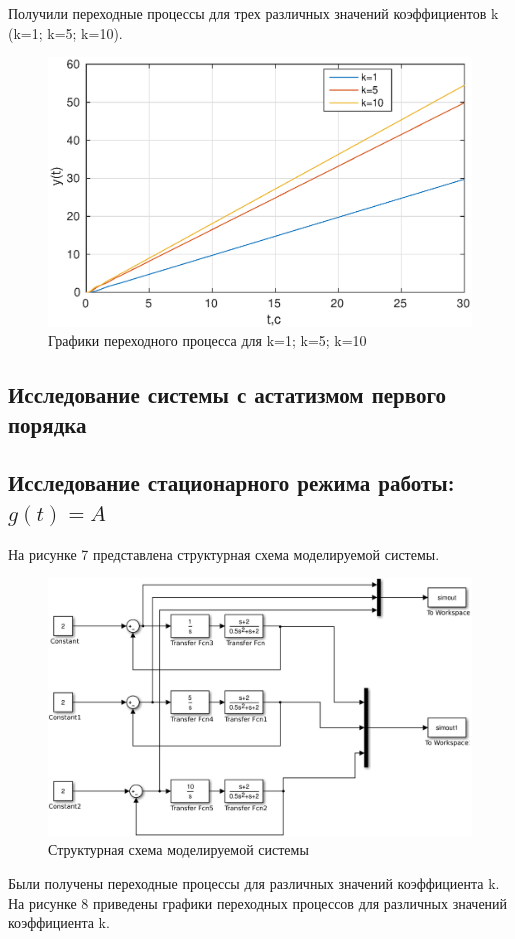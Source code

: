 \documentclass[12pt,a4paper]{article}
\begin{document}
Получили переходные процессы для трех различных значений коэффициентов k (k=1; k=5; k=10).
\begin{figure}[H]
\centering
\includegraphics[width=\textwidth]{1/1_2y(t).eps}
\caption{Графики переходного процесса для k=1; k=5; k=10}
\end{figure}

\newpage
\begin{center}
\section {Исследование системы с астатизмом первого порядка}
\end{center}
\subsection{Исследование стационарного режима работы: $g(t)= A$}

На рисунке 7 представлена структурная схема моделируемой системы.

\begin{figure}[H]
\centering
\includegraphics[width=\textwidth]{1/cxema_2.eps}
\caption{Структурная схема моделируемой  системы}
\end{figure}
Были получены переходные процессы для различных значений коэффициента  k.
На рисунке 8 приведены графики переходных процессов  для различных значений коэффициента  k.
\end{document}
